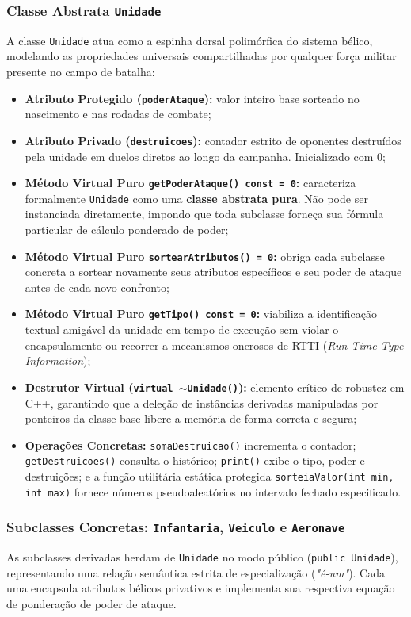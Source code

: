 \documentclass[12pt,a4paper]{article}
\begin{document}
\subsubsection{Classe Abstrata \texttt{Unidade}}
A classe \texttt{Unidade} atua como a espinha dorsal polimórfica do sistema bélico, modelando as propriedades universais compartilhadas por qualquer força militar presente no campo de batalha:
\begin{itemize}
    \item \textbf{Atributo Protegido (\texttt{poderAtaque}):} valor inteiro base sorteado no nascimento e nas rodadas de combate;
    \item \textbf{Atributo Privado (\texttt{destruicoes}):} contador estrito de oponentes destruídos pela unidade em duelos diretos ao longo da campanha. Inicializado com 0;
    \item \textbf{Método Virtual Puro \texttt{getPoderAtaque() const = 0}:} caracteriza formalmente \texttt{Unidade} como uma \textbf{classe abstrata pura}. Não pode ser instanciada diretamente, impondo que toda subclasse forneça sua fórmula particular de cálculo ponderado de poder;
    \item \textbf{Método Virtual Puro \texttt{sortearAtributos() = 0}:} obriga cada subclasse concreta a sortear novamente seus atributos específicos e seu poder de ataque antes de cada novo confronto;
    \item \textbf{Método Virtual Puro \texttt{getTipo() const = 0}:} viabiliza a identificação textual amigável da unidade em tempo de execução sem violar o encapsulamento ou recorrer a mecanismos onerosos de RTTI (\textit{Run-Time Type Information});
    \item \textbf{Destrutor Virtual (\texttt{virtual $\sim$Unidade()}):} elemento crítico de robustez em C++, garantindo que a deleção de instâncias derivadas manipuladas por ponteiros da classe base libere a memória de forma correta e segura;
    \item \textbf{Operações Concretas:} \texttt{somaDestruicao()} incrementa o contador; \texttt{getDestruicoes()} consulta o histórico; \texttt{print()} exibe o tipo, poder e destruições; e a função utilitária estática protegida \texttt{sorteiaValor(int min, int max)} fornece números pseudoaleatórios no intervalo fechado especificado.
\end{itemize}

\subsubsection{Subclasses Concretas: \texttt{Infantaria}, \texttt{Veiculo} e \texttt{Aeronave}}
As subclasses derivadas herdam de \texttt{Unidade} no modo público (\texttt{public Unidade}), representando uma relação semântica estrita de especialização (\textit{"é-um"}). Cada uma encapsula atributos bélicos privativos e implementa sua respectiva equação de ponderação de poder de ataque.
\end{document}
